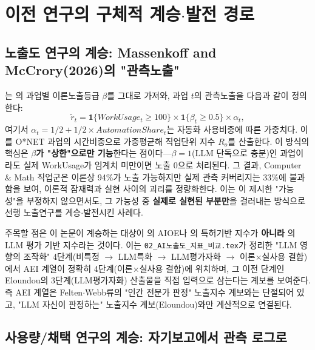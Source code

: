 \documentclass[11pt]{article}
\begin{document}
\section{이전 연구의 구체적 계승$\cdot$발전 경로}
\label{sec:lineage}

\subsection{노출도 연구의 계승: Massenkoff and McCrory(2026)의 "관측노출"}

\citet{massenkoff-2026-labor-market-impacts-of-ai}는 \citet{eloundou-2023-gpts-are-gpts-an-early}의 과업별 이론노출등급 $\beta$를 그대로 가져와, 과업 $t$의 관측노출을 다음과 같이 정의한다:
\[
\tilde{r}_t = \mathbf{1}\{WorkUsage_t \geq 100\} \times \mathbf{1}\{\beta_t \geq 0.5\} \times \alpha_t,
\]
여기서 $\alpha_t = 1/2 + 1/2 \times AutomationShare_t$는 자동화 사용비중에 따른 가중치다. 이를 O*NET 과업의 시간비중으로 가중평균해 직업단위 지수 $R_o$를 산출한다. 이 방식의 핵심은 \textbf{$\beta$가 "상한"으로만 기능}한다는 점이다—$\beta=1$(LLM 단독으로 충분)인 과업이라도 실제 WorkUsage가 임계치 미만이면 노출 0으로 처리된다. 그 결과, Computer \& Math 직업군은 이론상 94\%가 노출 가능하지만 실제 관측 커버리지는 33\%에 불과함을 보여, 이론적 잠재력과 실현 사이의 괴리를 정량화한다. 이는 \citet{eloundou-2023-gpts-are-gpts-an-early}이 제시한 "가능성"을 부정하지 않으면서도, 그 가능성 중 \textbf{실제로 실현된 부분만}을 걸러내는 방식으로 선행 노출연구를 계승$\cdot$발전시킨 사례다.

주목할 점은 이 논문이 계승하는 대상이 \citet{felten-2021-occupational-industry-and-geographic-exposure}의 AIOE나 \citet{webb-2020-impact-artificial-intelligence-labor}의 특허기반 지수가 \textbf{아니라} \citet{eloundou-2023-gpts-are-gpts-an-early}의 LLM 평가 기반 지수라는 것이다. 이는 \texttt{02\_AI노출도\_지표\_비교.tex}가 정리한 "LLM 영향의 조작화" 4단계(비특정 $\to$ LLM특화 $\to$ LLM평가자화 $\to$ 이론$\times$실사용 결합)에서 AEI 계열이 정확히 4단계(이론$\times$실사용 결합)에 위치하며, 그 이전 단계인 Eloundou의 3단계(LLM평가자화) 산출물을 직접 입력으로 삼는다는 계보를 보여준다. 즉 AEI 계열은 Felten$\cdot$Webb류의 "인간 전문가 판정" 노출지수 계보와는 단절되어 있고, "LLM 자신이 판정하는" 노출지수 계보(Eloundou)와만 계산적으로 연결된다.

\subsection{사용량/채택 연구의 계승: 자기보고에서 관측 로그로}
\end{document}
